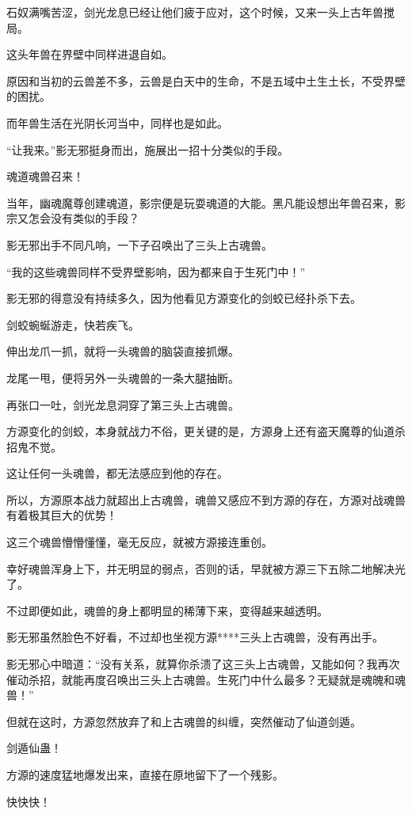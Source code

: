 \begin{this_body}
石奴满嘴苦涩，剑光龙息已经让他们疲于应对，这个时候，又来一头上古年兽搅局。

这头年兽在界壁中同样进退自如。

原因和当初的云兽差不多，云兽是白天中的生命，不是五域中土生土长，不受界壁的困扰。

而年兽生活在光阴长河当中，同样也是如此。

“让我来。”影无邪挺身而出，施展出一招十分类似的手段。

魂道魂兽召来！

当年，幽魂魔尊创建魂道，影宗便是玩耍魂道的大能。黑凡能设想出年兽召来，影宗又怎会没有类似的手段？

影无邪出手不同凡响，一下子召唤出了三头上古魂兽。

“我的这些魂兽同样不受界壁影响，因为都来自于生死门中！”

影无邪的得意没有持续多久，因为他看见方源变化的剑蛟已经扑杀下去。

剑蛟蜿蜒游走，快若疾飞。

伸出龙爪一抓，就将一头魂兽的脑袋直接抓爆。

龙尾一甩，便将另外一头魂兽的一条大腿抽断。

再张口一吐，剑光龙息洞穿了第三头上古魂兽。

方源变化的剑蛟，本身就战力不俗，更关键的是，方源身上还有盗天魔尊的仙道杀招鬼不觉。

这让任何一头魂兽，都无法感应到他的存在。

所以，方源原本战力就超出上古魂兽，魂兽又感应不到方源的存在，方源对战魂兽有着极其巨大的优势！

这三个魂兽懵懵懂懂，毫无反应，就被方源接连重创。

幸好魂兽浑身上下，并无明显的弱点，否则的话，早就被方源三下五除二地解决光了。

不过即便如此，魂兽的身上都明显的稀薄下来，变得越来越透明。

影无邪虽然脸色不好看，不过却也坐视方源****三头上古魂兽，没有再出手。

影无邪心中暗道：“没有关系，就算你杀溃了这三头上古魂兽，又能如何？我再次催动杀招，就能再度召唤出三头上古魂兽。生死门中什么最多？无疑就是魂魄和魂兽！”

但就在这时，方源忽然放弃了和上古魂兽的纠缠，突然催动了仙道剑遁。

剑遁仙蛊！

方源的速度猛地爆发出来，直接在原地留下了一个残影。

快快快！


\end{this_body}
